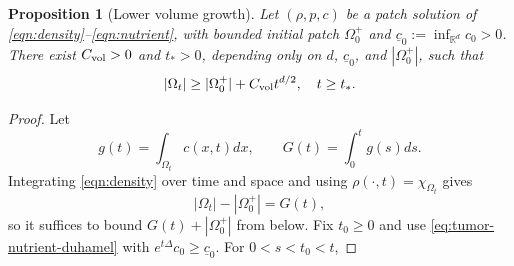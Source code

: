 \documentclass[11pt]{amsart}
\numberwithin{equation}{section}
\numberwithin{figure}{section}
\theoremstyle{plain}
\newtheorem{prop}[thm]{Proposition}
\theoremstyle{definition}
\theoremstyle{remark}
\theoremstyle{plain}
\def\R{\mathbb{R}}
\begin{document}
\begin{prop}[Lower volume growth]\label{prop:tumor-volume-growth}
Let $(\rho,p,c)$ be a patch solution of
\eqref{eqn:density}--\eqref{eqn:nutrient}, with bounded initial patch
$\Omega_0^{+}$ and $\underline c_0:=\inf_{\R^d}c_0>0$.  There exist
$C_{\rm vol}>0$ and $t_*>0$, depending only on $d$,
$\underline c_0$, and $|\Omega_0^{+}|$, such that
\begin{equation}\label{eq:tumor-volume-growth}
    |\Omega_t|\geq |\Omega_0^{+}|+C_{\rm vol}t^{d/2}, \quad t\geq t_*.
\end{equation}
\end{prop}
\begin{proof}
Let
\begin{equation}\label{eq:tumor-mass-functions}
    g(t)=\int_{\Omega_t}c(x,t)dx, \qquad G(t)=\int_{0}^tg(s)ds.
\end{equation}
Integrating \eqref{eqn:density} over time and space and using
$\rho(\cdot,t)=\chi_{\Omega_t}$ gives
\begin{equation}\label{eq:tumor-volume-mass-identity}
    |\Omega_t|-|\Omega_0^{+}|= G(t),
\end{equation}
so it suffices to bound $G(t)+|\Omega_0^{+}|$ from below. Fix
$t_0\geq0$ and use \eqref{eq:tumor-nutrient-duhamel} with
$e^{t\Delta}c_0\geq\underline c_0$. For $0<s<t_0<t$,


\end{proof}
\end{document}
